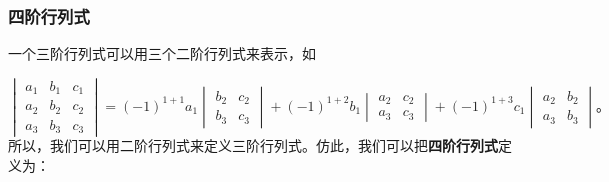 \subsubsection{四阶行列式}

一个三阶行列式可以用三个二阶行列式来表示，如

\begin{equation}
    \begin{vmatrix*}
        a_1 & b_1 & c_1 \\
        a_2 & b_2 & c_2 \\
        a_3 & b_3 & c_3
    \end{vmatrix*}
        = (-1)^{1+1}a_1 \begin{vmatrix*}
                b_2 & c_2 \\
                b_3 & c_3
            \end{vmatrix*}
        + (-1)^{1+2}b_1 \begin{vmatrix*}
                a_2 & c_2 \\
                a_3 & c_3
            \end{vmatrix*}
        + (-1)^{1+3}c_1 \begin{vmatrix*}
                a_2 & b_2 \\
                a_3 & b_3
            \end{vmatrix*} \text{。} \label{eq:sijiehls-1}
\end{equation}
所以，我们可以用二阶行列式来定义三阶行列式。仿此，我们可以把\textbf{四阶行列式}定义为：
